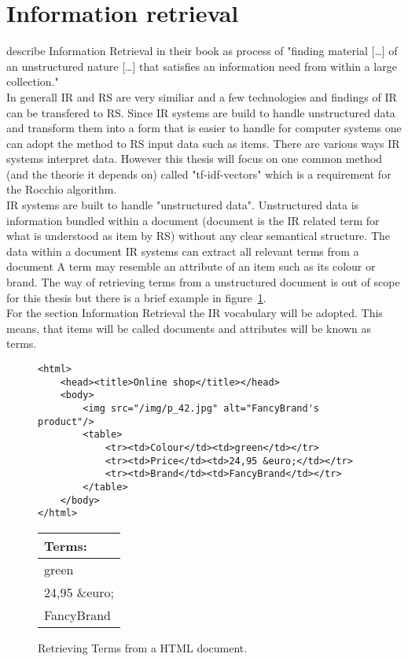 
\section{Information retrieval}
\iffalse
Was ist Information retrieval
in depth implementation is out of scope
Hinleitung zu Vektoren
\fi
\citeauthor{manning:2009} describe Information Retrieval in their book as process of "finding material [\dots] of an unstructured nature [\dots] that satisfies an information need from within a large collection."\citep[p.~1]{manning:2009}\\
In generall IR and RS are very similiar and a few technologies and findings of IR can be transfered to RS.
Since IR systems are build to handle unstructured data and transform them into a form that is easier to handle for computer systems one can adopt the method to RS input data such as items.\citep[p.~21-23]{ricci:2011}
There are various ways IR systems interpret data.
However this thesis will focus on one common method (and the theorie it depends on) called "tf-idf-vectors" which is a requirement for the Rocchio algorithm.\citep[p.~93]{lops:2011}\\
IR systems are built to handle "unstructured data".
Unstructured data is information bundled within a document (document is the IR related term for what is understood as item by RS) without any clear semantical structure.\citep[p.~1-3]{manning:2009}
The data within a document
IR systems can extract all relevant terms from a document
A term may resemble an attribute of an item such as its colour or brand.
The way of retrieving terms from a unstructured document is out of scope for this thesis but there is a brief example in figure~\ref{fig:TermRetrieving}.\\
For the section Information Retrieval the IR vocabulary will be adopted.
This means, that items will be called documents and attributes will be known as terms.

\begin{figure}[h]
    \center
    \begin{lstlisting}
<html>
    <head><title>Online shop</title></head>
    <body>
        <img src="/img/p_42.jpg" alt="FancyBrand's product"/>
        <table>
            <tr><td>Colour</td><td>green</td></tr>
            <tr><td>Price</td><td>24,95 &euro;</td></tr>
            <tr><td>Brand</td><td>FancyBrand</td></tr>
        </table>
    </body>
</html>
    \end{lstlisting}
    \begin{tabular}{ l }
        \textbf{Terms:}\\\hline
        green\\
        24,95 \&euro;\\
        FancyBrand%
    \end{tabular}
    \caption{Retrieving Terms from a HTML document.}
    \label{fig:TermRetrieving}
\end{figure}


